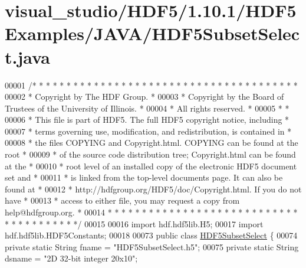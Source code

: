 \hypertarget{visual__studio_2_h_d_f5_21_810_81_2_h_d_f5_examples_2_j_a_v_a_2_h_d_f5_subset_select_8java_source}{}\section{visual\+\_\+studio/\+H\+D\+F5/1.10.1/\+H\+D\+F5\+Examples/\+J\+A\+V\+A/\+H\+D\+F5\+Subset\+Select.java}
\label{visual__studio_2_h_d_f5_21_810_81_2_h_d_f5_examples_2_j_a_v_a_2_h_d_f5_subset_select_8java_source}

\begin{DoxyCode}
00001 \textcolor{comment}{/* * * * * * * * * * * * * * * * * * * * * * * * * * * * * * * * * * * * * * *}
00002 \textcolor{comment}{ * Copyright by The HDF Group.                                               *}
00003 \textcolor{comment}{ * Copyright by the Board of Trustees of the University of Illinois.         *}
00004 \textcolor{comment}{ * All rights reserved.                                                      *}
00005 \textcolor{comment}{ *                                                                           *}
00006 \textcolor{comment}{ * This file is part of HDF5.  The full HDF5 copyright notice, including     *}
00007 \textcolor{comment}{ * terms governing use, modification, and redistribution, is contained in    *}
00008 \textcolor{comment}{ * the files COPYING and Copyright.html.  COPYING can be found at the root   *}
00009 \textcolor{comment}{ * of the source code distribution tree; Copyright.html can be found at the  *}
00010 \textcolor{comment}{ * root level of an installed copy of the electronic HDF5 document set and   *}
00011 \textcolor{comment}{ * is linked from the top-level documents page.  It can also be found at     *}
00012 \textcolor{comment}{ * http://hdfgroup.org/HDF5/doc/Copyright.html.  If you do not have          *}
00013 \textcolor{comment}{ * access to either file, you may request a copy from help@hdfgroup.org.     *}
00014 \textcolor{comment}{ * * * * * * * * * * * * * * * * * * * * * * * * * * * * * * * * * * * * * * */}
00015 
00016 \textcolor{keyword}{import} hdf.hdf5lib.H5;
00017 \textcolor{keyword}{import} hdf.hdf5lib.HDF5Constants;
00018 
00073 \textcolor{keyword}{public} \textcolor{keyword}{class }\hyperlink{class_h_d_f5_subset_select}{HDF5SubsetSelect} \{
00074     \textcolor{keyword}{private} \textcolor{keyword}{static} String fname  = \textcolor{stringliteral}{"HDF5SubsetSelect.h5"};
00075     \textcolor{keyword}{private} \textcolor{keyword}{static} String dsname  = \textcolor{stringliteral}{"2D 32-bit integer 20x10"};

\end{DoxyCode}
